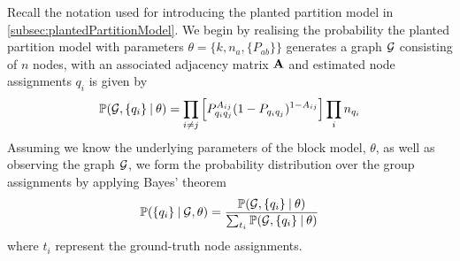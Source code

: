 Recall the notation used for introducing the planted partition model in \cref{subsec:plantedPartitionModel}.
We begin by realising the probability the planted partition model with parameters $\theta = \{k,n_{a},\{P_{ab}\}\}$ generates a graph $\mathcal G$ consisting of $n$ nodes, with an associated adjacency matrix $\mathbf A$ and estimated node assignments ${q_{i}}$ is given by
\begin{equation}
	\label{eq:probabilityPPMGeneratingGraph}
	\mathbb{P}(\mathcal G,\{q_{i}\} \:\lvert\: \theta) = \prod_{i \neq j} \left[ P_{q_{i}q_{j}}^{A_{ij}} (1-P_{q_{i}q_{j}})^{1-A_{ij}} \right] \prod_{i} n_{q_{i}}
\end{equation}
Assuming we know the underlying parameters of the block model, $\theta$, as well as observing the graph $\mathcal G$, we form the probability distribution over the group assignments by applying Bayes' theorem
\begin{equation}
	\label{eq:probabilityDistributionGroupAssignments}
	\mathbb{P}(\{q_{i}\} \:\lvert\: \mathcal G,\theta) = \frac{\mathbb{P}(\mathcal G,\{q_{i}\} \:\lvert\: \theta)}{\sum_{t_{i}} \mathbb{P}(\mathcal G,\{q_{i}\} \:\lvert\: \theta)}
\end{equation}
where $t_{i}$ represent the ground-truth node assignments.


